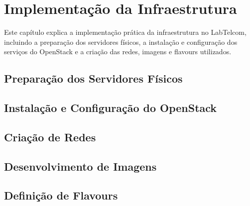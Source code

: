 \chapter{Implementação da Infraestrutura}

Este capítulo explica a implementação prática da infraestrutura no LabTelcom, incluindo a preparação dos servidores físicos, a instalação e configuração dos serviços do OpenStack e a criação das redes, imagens e flavours utilizados.

\section{Preparação dos Servidores Físicos}


\section{Instalação e Configuração do OpenStack}

\section{Criação de Redes}

\section{Desenvolvimento de Imagens}

\section{Definição de Flavours}
